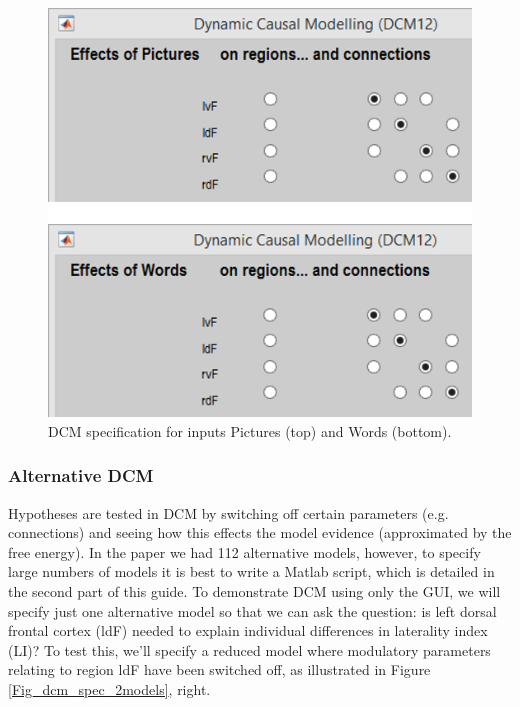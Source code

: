\documentclass{article}
\begin{document}
\begin{itemize}
\begin{figure}[ht]
\begin{center}
\includegraphics{"Fig_dcm_spec_Pictures_Words"}
\caption{DCM specification for inputs Pictures (top) and Words (bottom).\label{Fig_dcm_spec_Pictures_Words}}
\end{center}
\end{figure}

\end{itemize}

\subsubsection{Alternative DCM} \label{GUI_altDCM}
Hypotheses are tested in DCM by switching off certain parameters (e.g. connections) and seeing how this effects the model evidence (approximated by the free energy). In the paper we had 112 alternative models, however, to specify large numbers of models it is best to write a Matlab script, which is detailed in the second part of this guide. To demonstrate DCM using only the GUI, we will  specify just one alternative model so that we can ask the question: is left dorsal frontal cortex (ldF) needed to explain individual differences in laterality index (LI)? To test this, we'll specify a reduced model where modulatory parameters relating to region ldF have been switched off, as illustrated in Figure \ref{Fig_dcm_spec_2models}, right.
\end{document}
